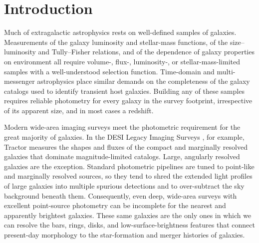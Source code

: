 \documentclass[modern,linenumbers]{aastex701}
\begin{document}
\section{Introduction}
\label{sec:intro}

Much of extragalactic astrophysics rests on well-defined samples of
galaxies. Measurements of the galaxy luminosity and stellar-mass
functions, of the size--luminosity and Tully--Fisher relations, and of
the dependence of galaxy properties on environment all require volume-,
flux-, luminosity-, or stellar-mass-limited samples with a
well-understood selection function. Time-domain and multi-messenger
astrophysics place similar demands on the completeness of the galaxy
catalogs used to identify transient host galaxies. Building any of
these samples requires reliable photometry for every galaxy in the
survey footprint, irrespective of its apparent size, and in most cases
a redshift.

Modern wide-area imaging surveys meet the photometric requirement for
the great majority of galaxies. In the DESI Legacy Imaging Surveys
\citep{dey19a}, for example, Tractor \citep{lang16a} measures the shapes
and fluxes of the compact and marginally resolved galaxies that dominate
magnitude-limited catalogs. Large, angularly resolved galaxies are the
exception. Standard photometric pipelines are tuned to point-like and
marginally resolved sources, so they tend to shred the extended light
profiles of large galaxies into multiple spurious detections and to
over-subtract the sky background beneath them. Consequently, even deep,
wide-area surveys with excellent point-source photometry can be
incomplete for the nearest and apparently brightest galaxies. These same
galaxies are the only ones in which we can resolve the bars, rings,
disks, and low-surface-brightness features that connect present-day
morphology to the star-formation and merger histories of galaxies.
\end{document}

